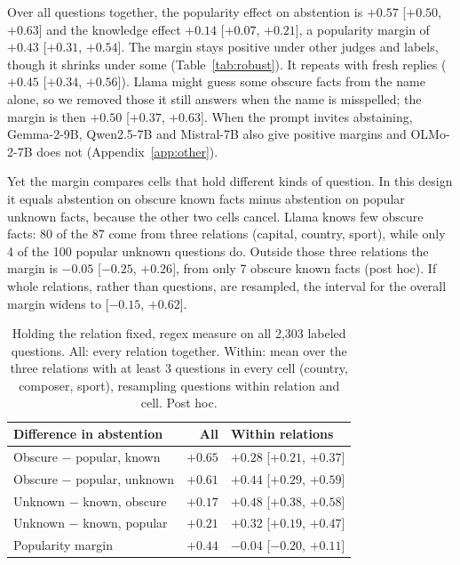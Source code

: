 \documentclass[letterpaper]{article} %
\begin{document}
Over all questions together, the popularity effect on abstention is $+0.57$ [$+0.50$, $+0.63$] and the knowledge effect $+0.14$ [$+0.07$, $+0.21$], a popularity margin of $+0.43$ [$+0.31$, $+0.54$]. The margin stays positive under other judges and labels, though it shrinks under some (Table~\ref{tab:robust}). It repeats with fresh replies ($+0.45$ [$+0.34$, $+0.56$]). Llama might guess some obscure facts from the name alone, so we removed those it still answers when the name is misspelled; the margin is then $+0.50$ [$+0.37$, $+0.63$]. When the prompt invites abstaining, Gemma-2-9B, Qwen2.5-7B and Mistral-7B also give positive margins and OLMo-2-7B does not (Appendix~\ref{app:other}).

Yet the margin compares cells that hold different kinds of question. In this design it equals abstention on obscure known facts minus abstention on popular unknown facts, because the other two cells cancel. Llama knows few obscure facts: 80 of the 87 come from three relations (capital, country, sport), while only 4 of the 100 popular unknown questions do. Outside those three relations the margin is $-0.05$ [$-0.25$, $+0.26$], from only 7 obscure known facts (post hoc). If whole relations, rather than questions, are resampled, the interval for the overall margin widens to [$-0.15$, $+0.62$].

\begin{table}[t]
\centering
\small
\setlength{\tabcolsep}{1.2mm}
\begin{tabular}{@{}lrl@{}}
\toprule
Difference in abstention & All & Within relations \\
\midrule
Obscure $-$ popular, known & $+0.65$ & $+0.28$ [$+0.21$, $+0.37$] \\
Obscure $-$ popular, unknown & $+0.61$ & $+0.44$ [$+0.29$, $+0.59$] \\
Unknown $-$ known, obscure & $+0.17$ & $+0.48$ [$+0.38$, $+0.58$] \\
Unknown $-$ known, popular & $+0.21$ & $+0.32$ [$+0.19$, $+0.47$] \\
\midrule
Popularity margin & $+0.44$ & $-0.04$ [$-0.20$, $+0.11$] \\
\bottomrule
\end{tabular}
\caption{Holding the relation fixed, regex measure on all 2,303 labeled questions. All: every relation together. Within: mean over the three relations with at least 3 questions in every cell (country, composer, sport), resampling questions within relation and cell. Post hoc.}
\label{tab:within}
\end{table}
\end{document}
